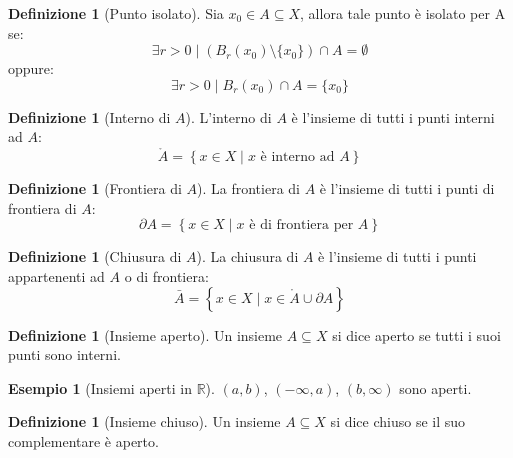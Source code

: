 \documentclass[11pt, a4paper, openright]{book}
\theoremstyle{plain}
\theoremstyle{definition}
\newtheorem{definizione}[teorema]{Definizione}
\newtheorem{esempio}[teorema]{Esempio}
\theoremstyle{remark}
\begin{document}
\begin{definizione}[Punto isolato]
    Sia $x_0 \in A \subseteq X$, allora tale punto è isolato per A se:
    \begin{equation}
        \exists r > 0 \mid (B_r(x_0) \setminus \{x_0\}) \cap A = \emptyset
    \end{equation}
    oppure:
    \begin{equation}
        \exists r > 0 \mid B_r(x_0) \cap A = \{x_0\}
    \end{equation}
\end{definizione}

\begin{definizione}[Interno di $A$]
    L'interno di $A$ è l'insieme di tutti i punti interni ad $A$:
    \begin{equation}
        \mathring{A} = \left\{x \in X \mid x \text{ è interno ad } A\right\} 
    \end{equation}
\end{definizione}

\begin{definizione}[Frontiera di $A$]
    La frontiera di $A$ è l'insieme di tutti i punti di frontiera di $A$:
    \begin{equation}
        \partial {A} = \left\{x \in X \mid x \text{ è di frontiera per } A\right\} 
    \end{equation}
\end{definizione}

\begin{definizione}[Chiusura di $A$]
    La chiusura di $A$ è l'insieme di tutti i punti appartenenti ad $A$ o di frontiera:
    \begin{equation}
        \bar{A} = \left\{x \in X \mid x \in \mathring{A} \cup \partial{A}\right\} 
    \end{equation}
\end{definizione}

\begin{definizione}[Insieme aperto]
    Un insieme $A \subseteq X$ si dice aperto se tutti i suoi punti sono interni.
\end{definizione}

\begin{esempio}[Insiemi aperti in $\mathbb{R}$]
    $(a, b)$, $(-\infty, a)$, $(b, \infty)$ sono aperti.
\end{esempio}


\begin{definizione}[Insieme chiuso]
    Un insieme $A \subseteq X$ si dice chiuso se il suo complementare è aperto.
\end{definizione}
\end{document}
